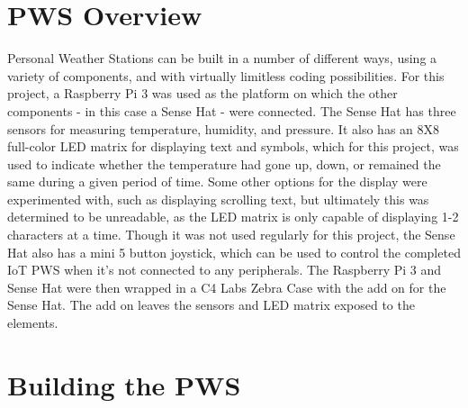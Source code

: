 \documentclass[sigconf]{acmart}
\begin{document}
\section{PWS Overview}

Personal Weather Stations can be built in a number of different ways, using a variety of components, and with virtually limitless coding possibilities. For this project, a Raspberry Pi 3 was used as the platform on which the other components - in this case a Sense Hat - were connected. The Sense Hat has three sensors for measuring temperature, humidity, and pressure. It also has an 8X8 full-color LED matrix for displaying text and symbols, which for this project, was used to indicate whether the temperature had gone up, down, or remained the same during a given period of time. Some other options for the display were experimented with, such as displaying scrolling text, but ultimately this was determined to be unreadable, as the LED matrix is only capable of displaying 1-2 characters at a time. Though it was not used regularly for this project, the Sense Hat also has a mini 5 button joystick, which can be used to control the completed IoT PWS when it's not connected to any peripherals. The Raspberry Pi 3 and Sense Hat were then wrapped in a C4 Labs Zebra Case with the add on for the Sense Hat. The add on leaves the sensors and LED matrix exposed to the elements. 

\section{Building the PWS}
\end{document}
